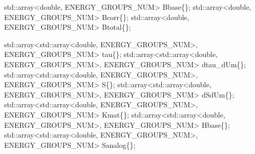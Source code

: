\documentclass[
]{article}
\newenvironment{Shaded}{}{}
\newcommand{\BuiltInTok}[1]{\textcolor[rgb]{0.00,0.50,0.00}{#1}}
\newcommand{\DataTypeTok}[1]{\textcolor[rgb]{0.56,0.13,0.00}{#1}}
\newcommand{\NormalTok}[1]{#1}
\newcommand{\OperatorTok}[1]{\textcolor[rgb]{0.40,0.40,0.40}{#1}}
\begin{document}
\begin{Shaded}
\begin{Highlighting}[]
    \BuiltInTok{std::}\NormalTok{array}\OperatorTok{\textless{}}\DataTypeTok{double}\OperatorTok{,}\NormalTok{ ENERGY\_GROUPS\_NUM}\OperatorTok{\textgreater{}}\NormalTok{ Bbase}\OperatorTok{\{\};}
    \BuiltInTok{std::}\NormalTok{array}\OperatorTok{\textless{}}\DataTypeTok{double}\OperatorTok{,}\NormalTok{ ENERGY\_GROUPS\_NUM}\OperatorTok{\textgreater{}}\NormalTok{ Bcorr}\OperatorTok{\{\};}
    \BuiltInTok{std::}\NormalTok{array}\OperatorTok{\textless{}}\DataTypeTok{double}\OperatorTok{,}\NormalTok{ ENERGY\_GROUPS\_NUM}\OperatorTok{\textgreater{}}\NormalTok{ Btotal}\OperatorTok{\{\};}

    \BuiltInTok{std::}\NormalTok{array}\OperatorTok{\textless{}}\BuiltInTok{std::}\NormalTok{array}\OperatorTok{\textless{}}\DataTypeTok{double}\OperatorTok{,}\NormalTok{ ENERGY\_GROUPS\_NUM}\OperatorTok{\textgreater{},}\NormalTok{ ENERGY\_GROUPS\_NUM}\OperatorTok{\textgreater{}}\NormalTok{ tau}\OperatorTok{\{\};}
    \BuiltInTok{std::}\NormalTok{array}\OperatorTok{\textless{}}\BuiltInTok{std::}\NormalTok{array}\OperatorTok{\textless{}}\DataTypeTok{double}\OperatorTok{,}\NormalTok{ ENERGY\_GROUPS\_NUM}\OperatorTok{\textgreater{},}\NormalTok{ ENERGY\_GROUPS\_NUM}\OperatorTok{\textgreater{}}\NormalTok{ dtau\_dUm}\OperatorTok{\{\};}
    \BuiltInTok{std::}\NormalTok{array}\OperatorTok{\textless{}}\BuiltInTok{std::}\NormalTok{array}\OperatorTok{\textless{}}\DataTypeTok{double}\OperatorTok{,}\NormalTok{ ENERGY\_GROUPS\_NUM}\OperatorTok{\textgreater{},}\NormalTok{ ENERGY\_GROUPS\_NUM}\OperatorTok{\textgreater{}}\NormalTok{ S}\OperatorTok{\{\};}
    \BuiltInTok{std::}\NormalTok{array}\OperatorTok{\textless{}}\BuiltInTok{std::}\NormalTok{array}\OperatorTok{\textless{}}\DataTypeTok{double}\OperatorTok{,}\NormalTok{ ENERGY\_GROUPS\_NUM}\OperatorTok{\textgreater{},}\NormalTok{ ENERGY\_GROUPS\_NUM}\OperatorTok{\textgreater{}}\NormalTok{ dSdUm}\OperatorTok{\{\};}
    \BuiltInTok{std::}\NormalTok{array}\OperatorTok{\textless{}}\BuiltInTok{std::}\NormalTok{array}\OperatorTok{\textless{}}\DataTypeTok{double}\OperatorTok{,}\NormalTok{ ENERGY\_GROUPS\_NUM}\OperatorTok{\textgreater{},}\NormalTok{ ENERGY\_GROUPS\_NUM}\OperatorTok{\textgreater{}}\NormalTok{ Kmat}\OperatorTok{\{\};}
    \BuiltInTok{std::}\NormalTok{array}\OperatorTok{\textless{}}\BuiltInTok{std::}\NormalTok{array}\OperatorTok{\textless{}}\DataTypeTok{double}\OperatorTok{,}\NormalTok{ ENERGY\_GROUPS\_NUM}\OperatorTok{\textgreater{},}\NormalTok{ ENERGY\_GROUPS\_NUM}\OperatorTok{\textgreater{}}\NormalTok{ Hbase}\OperatorTok{\{\};}
    \BuiltInTok{std::}\NormalTok{array}\OperatorTok{\textless{}}\BuiltInTok{std::}\NormalTok{array}\OperatorTok{\textless{}}\DataTypeTok{double}\OperatorTok{,}\NormalTok{ ENERGY\_GROUPS\_NUM}\OperatorTok{\textgreater{},}\NormalTok{ ENERGY\_GROUPS\_NUM}\OperatorTok{\textgreater{}}\NormalTok{ Sanalog}\OperatorTok{\{\};}

\end{Highlighting}
\end{Shaded}
\end{document}
